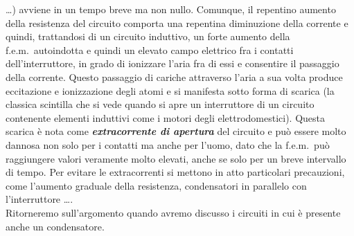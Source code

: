 \dots) avviene in un tempo breve ma non nullo. Comunque, il repentino aumento
della resistenza del circuito comporta una repentina diminuzione della corrente
e quindi, trattandosi di un circuito induttivo, un forte aumento della
f.e.m.\ autoindotta e quindi un elevato campo elettrico fra i contatti
dell'interruttore, in grado di ionizzare l'aria fra di essi e consentire il
passaggio della corrente. Questo passaggio di cariche attraverso l'aria a sua
volta produce eccitazione e ionizzazione degli atomi e si manifesta sotto forma
di scarica (la classica scintilla che si vede quando si apre un interruttore di
un circuito contenente elementi induttivi come i motori degli elettrodomestici).
Questa scarica \`e nota come \textbf{\textit{extracorrente di apertura}} del
circuito e pu\`o essere molto dannosa non solo per i contatti ma anche per
l'uomo, dato che la f.e.m.\ pu\`o raggiungere valori veramente molto elevati,
anche se solo per un breve intervallo di tempo. Per evitare le extracorrenti si
mettono in atto particolari precauzioni, come l'aumento graduale della
resistenza, condensatori in parallelo con l'interruttore \dots.\\
Ritorneremo sull'argomento quando avremo discusso i circuiti in cui \`e presente
anche un condensatore.

